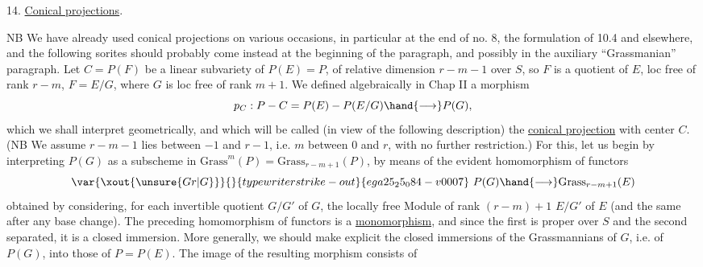
14. \uline{Conical projections}.

NB We have already used conical projections on various
occasions, in particular at the end of no. 8, the formulation of 10.4 and elsewhere, and
the following sorites should probably come instead at the beginning of the paragraph,
and possibly in the auxiliary “Grassmanian” paragraph.
Let $C = P(F)$ be a linear subvariety of $P(E)=P$, of relative
dimension $r-m-1$  over $S$, so $F$ is a quotient of $E$, loc free of
rank $r-m$, $F=E/G$, where $G$ is loc free of rank $m+1$. We defined
algebraically in Chap II a morphism
\[ p_C : P - C = P(E) - P(E/G) \hand{\longrightarrow} P(G) , \]
which we shall interpret geometrically, and which will be called
(in view of the following description) the \uline{conical projection} with center $C$.
(NB We assume $r-m-1$ lies between $-1$ and $r-1$, i.e. $m$ between $0$
and $r$, with no further restriction.) For this, let us begin by interpreting  $P(G)$
as a subscheme in $\mathrm{Grass}^m(P)= \mathrm{Grass}_{r-m+1}(P)$, by means of the evident homomorphism
of functors
\[ \var{\xout{\unsure{Gr|G}}}{}{typewriter strike-out}{ega25_25_084-v0007}\ P(G) \hand{\longrightarrow} \mathrm{Grass}_{r-m+1}(E) \]
obtained by considering, for each invertible quotient $G/G'$ of $G$, the
locally free Module of rank $(r-m)+1$ $E/G'$ of $E$ (and the same after
any base change). The preceding homomorphism of functors is a
\uline{monomorphism}, and since the first is proper over $S$ and the second separated,
it is a closed immersion. More generally, we should make explicit
the closed immersions of the Grassmannians of $G$, i.e. of $P(G)$,
into those of  $P=P(E)$.  The image of the resulting morphism consists of
